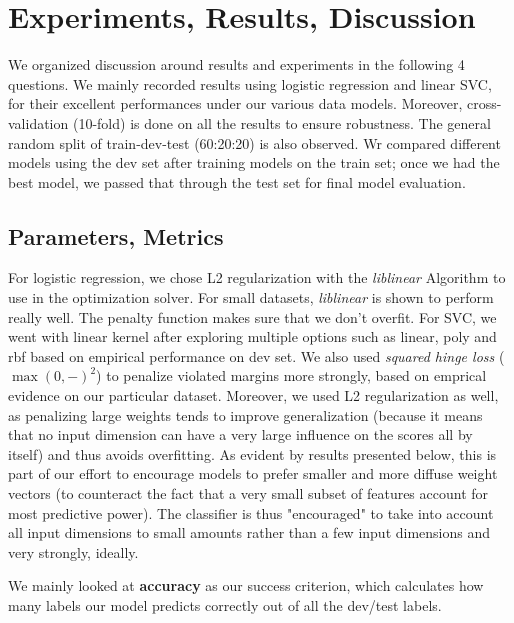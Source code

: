 \documentclass[paper=a4, fontsize=10pt]{scrartcl} %
\numberwithin{equation}{section} %
\numberwithin{figure}{section} %
\numberwithin{table}{section} %
\begin{document}

\section{Experiments, Results, Discussion}
We organized discussion around results and experiments in the following 4 questions. We mainly recorded results using logistic regression and linear SVC, for their excellent performances under our various data models. Moreover, cross-validation (10-fold) is done on all the results to ensure robustness. The general random split of train-dev-test (60:20:20) is also observed. Wr compared different models using the dev set after training models on the train set; once we had the best model, we passed that through the test set for final model evaluation. 
\subsection{Parameters, Metrics}
For logistic regression, we chose L2 regularization with the \textit{liblinear} Algorithm \cite{hsieh2008dual} to use in the optimization solver. For small datasets, \textit{liblinear} is shown to perform really well. The penalty function makes sure that we don't overfit. 
For SVC, we went with linear kernel after exploring multiple options such as linear, poly and rbf based on empirical performance on dev set. We also used \textit{squared hinge loss} ($\max(0,-)^2$) to penalize violated margins more strongly, based on emprical evidence on our particular dataset. Moreover, we used L2 regularization as well, as penalizing large weights tends to improve generalization (because it means that no input dimension can have a very large influence on the scores all by itself) and thus avoids overfitting. As evident by results presented below, this is part of our effort to encourage models to prefer smaller and more diffuse weight vectors (to counteract the fact that a very small subset of features account for most predictive power). The classifier is thus "encouraged" to take into account all input dimensions to small amounts rather than a few input dimensions and very strongly, ideally. 

We mainly looked at \textbf{accuracy} as our success criterion, which calculates how many labels our model predicts correctly out of all the dev/test labels.  
\end{document}
